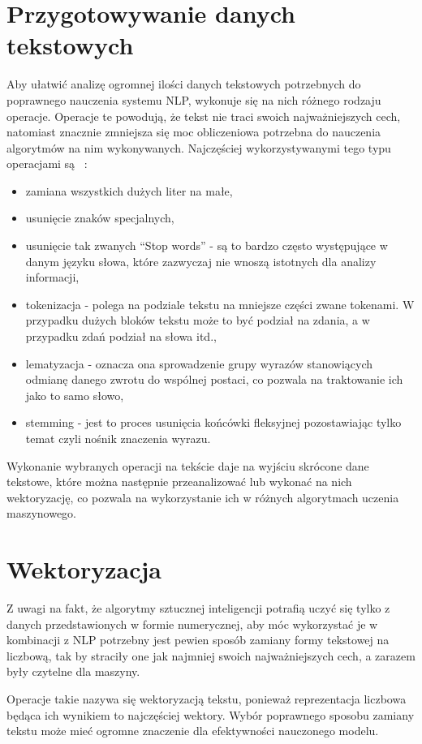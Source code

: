 \section{Przygotowywanie danych tekstowych}
Aby ułatwić analizę ogromnej ilości danych tekstowych potrzebnych do poprawnego nauczenia systemu NLP,
wykonuje się na nich różnego rodzaju operacje. Operacje te powodują, że tekst nie traci swoich najważniejszych cech, 
natomiast znacznie zmniejsza się moc obliczeniowa potrzebna do nauczenia algorytmów na nim wykonywanych. 
Najczęściej wykorzystywanymi tego typu operacjami są ~\cite{preprocessing}:
\begin{itemize}
    \item zamiana wszystkich dużych liter na małe,
    \item usunięcie znaków specjalnych,
    \item usunięcie tak zwanych ``Stop words'' - są to bardzo często występujące w danym języku słowa, które 
    zazwyczaj nie wnoszą istotnych dla analizy informacji,
    \item tokenizacja - polega na podziale tekstu na mniejsze części zwane tokenami. W przypadku dużych bloków 
    tekstu może to być podział na zdania, a w przypadku zdań podział na słowa itd.,
    \item lematyzacja - oznacza ona sprowadzenie grupy wyrazów stanowiących odmianę danego zwrotu do wspólnej postaci,
    co pozwala na traktowanie ich jako to samo słowo,
    \item stemming - jest to proces usunięcia końcówki fleksyjnej pozostawiając tylko temat czyli nośnik znaczenia 
    wyrazu.
\end{itemize}
Wykonanie wybranych operacji na tekście daje na wyjściu skrócone dane tekstowe, które można następnie przeanalizować lub 
wykonać na nich wektoryzację, co pozwala na wykorzystanie ich w różnych algorytmach uczenia maszynowego. 
\section{Wektoryzacja}
Z uwagi na fakt, że algorytmy sztucznej inteligencji potrafią uczyć się tylko z danych przedstawionych w formie numerycznej, aby móc 
wykorzystać je w kombinacji z NLP potrzebny jest pewien sposób zamiany formy tekstowej na liczbową, tak by straciły one jak najmniej
swoich najważniejszych cech, a zarazem były czytelne dla maszyny. 

Operacje takie nazywa się wektoryzacją tekstu, ponieważ 
reprezentacja liczbowa będąca ich wynikiem to najczęściej wektory. 
Wybór poprawnego sposobu zamiany tekstu może mieć ogromne znaczenie dla efektywności nauczonego modelu.

